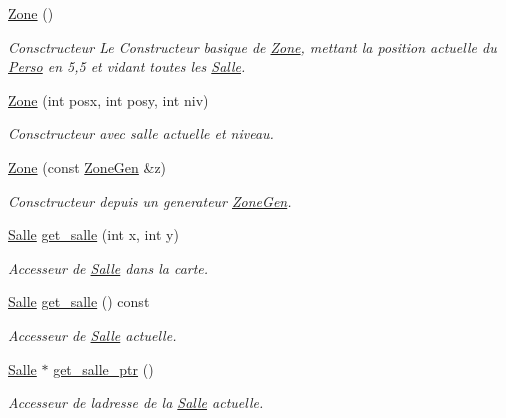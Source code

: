 \begin{DoxyCompactItemize}
\item 
\hyperlink{classZone_a37c9721c0d592a7a231f4e6dbae93277}{Zone} ()
\begin{DoxyCompactList}\small\item\em Consctructeur Le Constructeur basique de \hyperlink{classZone}{Zone}, mettant la position actuelle du \hyperlink{classPerso}{Perso} en 5,5 et vidant toutes les \hyperlink{classSalle}{Salle}. \end{DoxyCompactList}\item 
\hyperlink{classZone_a47c33a8aad7a0c17ff8ab213aad492f7}{Zone} (int posx, int posy, int niv)
\begin{DoxyCompactList}\small\item\em Consctructeur avec salle actuelle et niveau. \end{DoxyCompactList}\item 
\hyperlink{classZone_afddea0858e93cf8050e6263347b6864f}{Zone} (const \hyperlink{classZoneGen}{Zone\+Gen} \&z)
\begin{DoxyCompactList}\small\item\em Consctructeur depuis un generateur \hyperlink{classZoneGen}{Zone\+Gen}. \end{DoxyCompactList}\item 
\hyperlink{classSalle}{Salle} \hyperlink{classZone_a6b28456d584e884cdeceaf6d4dcedbd1}{get\+\_\+salle} (int x, int y)
\begin{DoxyCompactList}\small\item\em Accesseur de \hyperlink{classSalle}{Salle} dans la {\itshape carte}. \end{DoxyCompactList}\item 
\hyperlink{classSalle}{Salle} \hyperlink{classZone_a3214726410943fed7c5a44f49e998cee}{get\+\_\+salle} () const 
\begin{DoxyCompactList}\small\item\em Accesseur de \hyperlink{classSalle}{Salle} actuelle. \end{DoxyCompactList}\item 
\hyperlink{classSalle}{Salle} $\ast$ \hyperlink{classZone_a96398ba4ec2f3c8b2caddadf2a82f153}{get\+\_\+salle\+\_\+ptr} ()
\begin{DoxyCompactList}\small\item\em Accesseur de l\textquotesingle{}adresse de la \hyperlink{classSalle}{Salle} actuelle. \end{DoxyCompactList}\item 

\end{DoxyCompactItemize}
